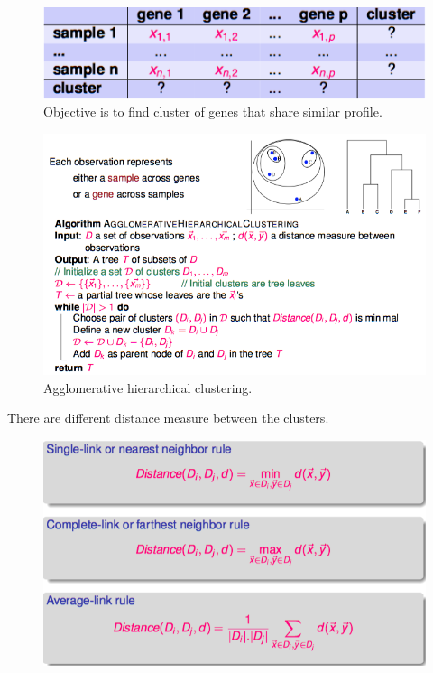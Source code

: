 \begin{figure}[H]
	\centering
	\includegraphics[scale=0.4]{images/50_unsupervised.png}
	\caption{Objective is to find cluster of genes that share similar profile.}
\end{figure}


\begin{figure}[H]
	\centering
	\includegraphics[scale=0.55]{images/55_agglo.png}
	\caption{Agglomerative hierarchical clustering.}
\end{figure}
There are different distance measure between the clusters.

\begin{figure}[htp]
	\centering
	\includegraphics[scale=0.6]{images/56_measure.png}
\end{figure}

